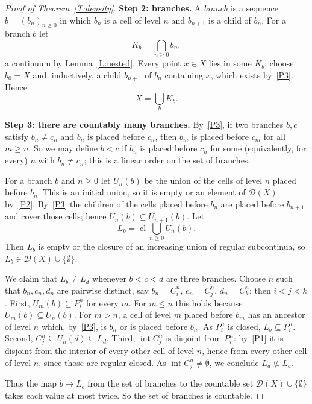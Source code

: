 \documentclass[11pt,reqno]{amsart}
\theoremstyle{plain}
\theoremstyle{definition}
\theoremstyle{remark}
\newcommand{\D}{\mathcal{D}}
\newcommand{\cl}{\operatorname{cl}}
\newcommand{\intr}{\operatorname{int}}
\begin{document}
\begin{proof}[Proof of Theorem~\ref{T:density}]
\medskip
\noindent\textbf{Step 2: branches.} A \emph{branch} is a sequence $b=(b_n)_{n\ge0}$ in which $b_n$ is a cell of level $n$ and $b_{n+1}$ is a child of $b_n$. For a branch $b$ let
\[
K_b=\bigcap_{n\ge0}b_n ,
\]
a continuum by Lemma~\ref{L:nested}. Every point $x\in X$ lies in some $K_b$: choose $b_0=X$ and, inductively, a child $b_{n+1}$ of $b_n$ containing $x$, which exists by~\ref{P3}. Hence
\begin{equation}\label{E:cover}
X=\bigcup_bK_b .
\end{equation}

\medskip
\noindent\textbf{Step 3: there are countably many branches.} By~\ref{P3}, if two branches $b,c$ satisfy $b_n\neq c_n$ and $b_n$ is placed before $c_n$, then $b_m$ is placed before $c_m$ for all $m\ge n$. So we may define $b<c$ if $b_n$ is placed before $c_n$ for some (equivalently, for every) $n$ with $b_n\neq c_n$; this is a linear order on the set of branches.

For a branch $b$ and $n\ge0$ let $U_n(b)$ be the union of the cells of level $n$ placed before $b_n$. This is an initial union, so it is empty or an element of $\D(X)$ by~\ref{P2}. By~\ref{P3} the children of the cells placed before $b_n$ are placed before $b_{n+1}$ and cover those cells; hence $U_n(b)\subseteq U_{n+1}(b)$. Let
\[
L_b=\cl\bigcup_{n\ge0}U_n(b).
\]
Then $L_b$ is empty or the closure of an increasing union of regular subcontinua, so $L_b\in\D(X)\cup\{\emptyset\}$.

We claim that $L_b\neq L_d$ whenever $b<c<d$ are three branches. Choose $n$ such that $b_n,c_n,d_n$ are pairwise distinct, say $b_n=C^n_i$, $c_n=C^n_j$, $d_n=C^n_k$; then $i<j<k$. First, $U_m(b)\subseteq P^n_i$ for every $m$. For $m\le n$ this holds because $U_m(b)\subseteq U_n(b)$. For $m>n$, a cell of level $m$ placed before $b_m$ has an ancestor of level $n$ which, by~\ref{P3}, is $b_n$ or is placed before $b_n$. As $P^n_i$ is closed, $L_b\subseteq P^n_i$. Second, $C^n_j\subseteq U_n(d)\subseteq L_d$. Third, $\intr C^n_j$ is disjoint from $P^n_i$: by~\ref{P1} it is disjoint from the interior of every other cell of level $n$, hence from every other cell of level $n$, since those are regular closed. As $\intr C^n_j\neq\emptyset$, we conclude $L_d\not\subseteq L_b$.

Thus the map $b\mapsto L_b$ from the set of branches to the countable set $\D(X)\cup\{\emptyset\}$ takes each value at most twice. So the set of branches is countable.


\end{proof}
\end{document}
